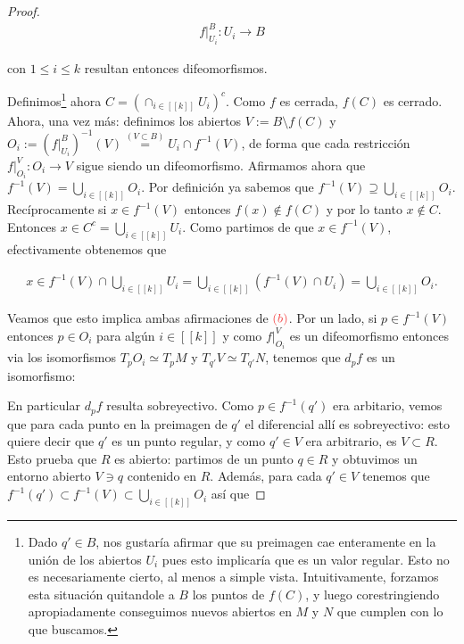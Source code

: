 \documentclass[11pt]{article}
\newcommand{\nat}[1]{[\![#1]\!]}
\newcommand{\paint}[2]{\color{#1}{#2}}
\newcommand*{\isoarrow}[1]{\arrow[#1,"\rotatebox{90}{\LARGE{\(\sim\)}}"
]}
\begin{document}
\begin{proof}
\begin{align*}
f|_{U_i}^{B} : U_i \to B
\end{align*}

con $1 \leq i \leq k$ resultan entonces difeomorfismos.

Definimos\footnote{Dado $q' \in B$, nos gustar\'ia afirmar que su preimagen cae enteramente en la uni\'on de los abiertos $U_i$ pues esto implicar\'ia que es un valor regular. Esto no es necesariamente cierto, al menos a simple vista. Intuitivamente, forzamos esta situaci\'on quitandole a $B$ los puntos de $f(C)$, y luego corestringiendo apropiadamente conseguimos nuevos abiertos en $M$ y $N$ que cumplen con lo que buscamos.} ahora $C = (\cap_{i \in \nat{k}} U_i)^c$. Como $f$ es cerrada, $f(C)$ es cerrado. Ahora, una vez m\'as: definimos los abiertos $V := B \setminus f(C)$ y $O_i := (f|_{U_i}^B)^{-1}(V) \stackrel{(V \subset B)}{=} U_i \cap f^{-1}(V)$, de forma que cada restricci\'on $f|_{O_i}^V: O_i \to V$ sigue siendo un difeomorfismo. Afirmamos ahora que $f^{-1}(V) = \bigcup_{i \in \nat{k}}O_i$. Por definici\'on ya sabemos que $f^{-1}(V) \supseteq \bigcup_{i \in \nat{k}}O_i$. Rec\'iprocamente si $x \in f^{-1}(V)$ entonces $f(x) \not \in f(C)$ y por lo tanto $x \not \in C $. Entonces $x \in C^c = \bigcup_{i \in \nat{k}}U_i$. Como partimos de que $x \in f^{-1}(V)$, efectivamente obtenemos que

\begin{align*}
x \in f^{-1}(V) \cap \bigcup_{i \in \nat{k}}U_i = \bigcup_{i \in \nat{k}}(f^{-1}(V) \cap U_i) = \bigcup_{i \in \nat{k}}O_i.
\end{align*} 

Veamos que esto implica ambas afirmaciones de $\paint{red}{(b)}$. Por un lado, si $p \in f^{-1}(V)$ entonces $p \in O_i$ para alg\'un $i \in \nat{k}$ y como $f|_{O_i}^V$ es un difeomorfismo entonces via los isomorfismos $T_pO_i \simeq T_pM$ y $T_{q'}V \simeq T_{q'}N$, tenemos que $d_pf$ es un isomorfismo:

\begin{center}
\end{center}
En particular $d_pf$ resulta sobreyectivo. Como $p \in f^{-1}(q')$ era arbitario, vemos que para cada punto en la preimagen de $q'$ el diferencial all\'i es sobreyectivo: esto quiere decir que $q'$ es un punto regular, y como $q' \in V$ era arbitrario, es $V \subset R$. Esto prueba que $R$ es abierto: partimos de un punto $q \in R$ y obtuvimos un entorno abierto $V \ni q$ contenido en $R$. Adem\'as, para cada $q' \in V$ tenemos que $f^{-1}(q') \subset f^{-1}(V) \subset \bigcup_{i \in \nat{k}}O_i$ as\'i que


\end{proof}
\end{document}
